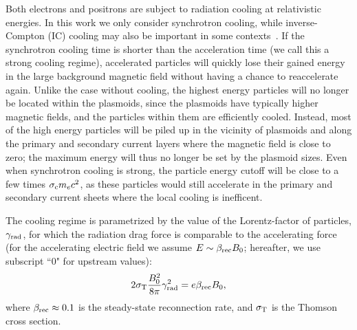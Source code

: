 Both electrons and positrons are subject to radiation cooling at relativistic energies. In this work we only consider synchrotron cooling, while  inverse-Compton (IC) cooling may also be important in some contexts~\citep{2018arXiv180501910W}. If the synchrotron cooling time is shorter than the acceleration time (we call this a strong cooling regime), accelerated particles will quickly lose their gained energy in the large background magnetic field without having a chance to reaccelerate again. Unlike the case without cooling, the highest energy particles will no longer be located within the plasmoids, since the plasmoids have typically higher magnetic fields, and the particles within them are efficiently cooled. Instead, most of the high energy particles will be piled up in the vicinity of plasmoids and along the primary and secondary current layers where the magnetic field is close to zero; the maximum energy will thus no longer be set by the plasmoid sizes. Even when synchrotron cooling is strong, the particle energy cutoff will be close to a few times $\sigma_{\rm c}m_e c^2$, as these particles would still accelerate in the primary and secondary current sheets where the local cooling is inefficent.



The cooling regime is parametrized by the value of the Lorentz-factor of particles, $\gamma_{\rm rad}$, for which the radiation drag force is comparable to the accelerating force (for the accelerating electric field we assume $E \sim \beta_{\rm rec} B_0$; hereafter, we use subscript ``0" for upstream values):
\begin{equation}
    \label{eq:pairprod-def_gammarad}
    2\sigma_{\rm T}\frac{B_0^2}{8\pi}\gamma_{\rm rad}^2 = e\beta_{\rm rec}B_0,
\end{equation}
where $\beta_{\rm rec}\approx 0.1$ is the steady-state reconnection rate, and $\sigma_{\rm T}$ is the Thomson cross section.


